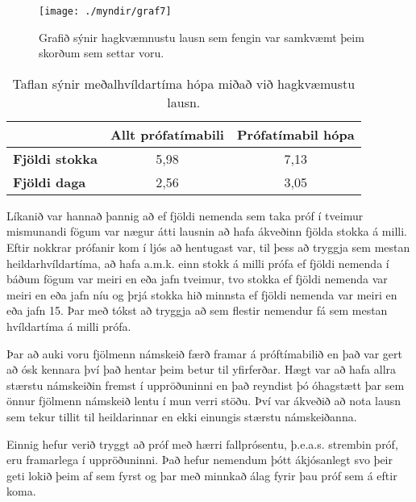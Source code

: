 \documentclass[12pt]{article}
\begin{document}
\begin{figure}[h]
    \centering
    \texttt{[image: ./myndir/graf7]}
    \caption{Grafið sýnir hagkvæmnustu lausn sem fengin var samkvæmt þeim skorðum sem settar voru.}
\end{figure}

\begin{table}[h]
    \centering
    \begin{tabular}{l|c|c|}
        \cline{2-3}
        & \multicolumn{1}{l|}{\textbf{Allt prófatímabili}} & \multicolumn{1}{l|}{\textbf{Prófatímabil hópa}} \\ \hline
        \multicolumn{1}{|l|}{\textbf{Fjöldi stokka}} & 5,98                                             & 7,13                                            \\ \hline
        \multicolumn{1}{|l|}{\textbf{Fjöldi daga}}   & 2,56                                             & 3,05                                            \\ \hline
    \end{tabular}
    \caption{Taflan sýnir meðalhvíldartíma hópa miðað við hagkvæmustu lausn. }
\end{table}

Líkanið var hannað þannig að ef fjöldi nemenda sem taka próf í tveimur mismunandi fögum var nægur átti lausnin að hafa ákveðinn fjölda stokka á milli. Eftir nokkrar prófanir kom í ljós að hentugast var, til þess að tryggja sem mestan heildarhvíldartíma, að hafa a.m.k. einn stokk á milli prófa ef fjöldi nemenda í báðum fögum var meiri en eða jafn tveimur, tvo stokka ef fjöldi nemenda var meiri en eða jafn níu og þrjá stokka hið minnsta ef fjöldi nemenda var meiri en eða jafn 15. Þar með tókst að tryggja að sem flestir nemendur fá sem mestan hvíldartíma á milli prófa. 

\medskip

Þar að auki voru fjölmenn námskeið færð framar á próftímabilið en það var gert
að ósk kennara því það hentar þeim betur til yfirferðar. Hægt var að hafa allra stærstu námskeiðin fremst í uppröðuninni en það reyndist þó óhagstætt þar sem önnur fjölmenn námskeið lentu í mun verri stöðu. Því var ákveðið að nota lausn sem tekur tillit til heildarinnar en ekki einungis stærstu námskeiðanna.

Einnig hefur verið tryggt að próf með hærri fallprósentu, þ.e.a.s. strembin próf, eru framarlega í uppröðuninni. Það hefur nemendum þótt ákjósanlegt svo þeir geti lokið þeim af sem fyrst og þar með minnkað álag fyrir þau próf sem á eftir koma. 
\medskip
\end{document}
